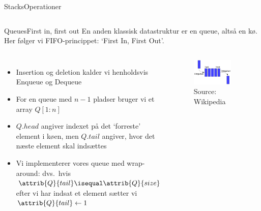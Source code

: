 \documentclass[aspectratio=1610]{beamer}
\begin{document}
\begin{frame}{Stacks}{Operationer}
\begin{columns}
    \end{columns}
\end{frame}

\begin{frame}{Queues}{First in, first out}
    En anden klassisk datastruktur er en \alert{queue}, altså en kø. Her følger
    vi \alert{FIFO}-princippet: `First In, First Out'.

    \begin{columns}
        \begin{itemize}
            \item Insertion og deletion kalder vi henholdsvis \alert{Enqueue} og
                \alert{Dequeue}
            \item For en queue med $n-1$ pladser bruger vi et array $Q[1:n]$
            \item $Q.head$ angiver indexet på det `forreste' element i køen, men
                $Q.tail$ angiver, hvor det næste element skal indsættes
            \item Vi implementerer vores queue med \alert{wrap-around}: dvs.\
                hvis $\attrib{Q}{tail} \isequal \attrib{Q}{size}$ efter vi har
                indsat et element sætter vi $\attrib{Q}{tail} \gets 1$
        \end{itemize}
    
        \begin{figure}[h]
            \centering
            \includegraphics[width=0.8\textwidth]{queue}
            \caption{Source: Wikipedia}
        \end{figure}
    \end{columns}
\end{frame}
\end{document}
